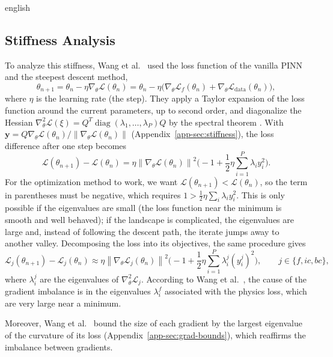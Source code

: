 \documentclass[11pt,letterpaper,twoside,openright]{book} %
\newcommand{\norm}[1]{\left\lVert #1 \right\rVert}
\newcommand{\Loss}{\mathcal{L}}
\DeclareMathOperator{\diag}{diag}
\begin{document}
\begin{hyphenrules}{english}
\subsection{Stiffness Analysis}

To analyze this stiffness, Wang et al.~\cite{wang2021gradient} used the loss function of the vanilla PINN and
the steepest descent method,
\begin{equation}
  \theta_{n+1}=\theta_n-\eta\nabla_\theta\Loss(\theta_n)=\theta_n-\eta\big(\nabla_\theta\Loss_f(\theta_n)+\nabla_\theta\Loss_{\mathrm{data}}(\theta_n)\big),
  \label{eq:gd}
\end{equation}
where $\eta$ is the learning rate (the step). They apply a Taylor expansion of the loss function around the current parameters, up to second order,
and diagonalize the Hessian $\nabla^2_\theta\Loss(\xi)=Q^{T}\diag(\lambda_1,\dots,\lambda_P)Q$ by the
spectral theorem \cite{trefethen1997}. With $\mathbf{y}=Q\nabla_\theta\Loss(\theta_n)/\norm{\nabla_\theta\Loss(\theta_n)}$
(Appendix~\ref{app-sec:stiffness}), the loss difference after one step becomes
\begin{equation}
  \Loss(\theta_{n+1})-\Loss(\theta_n)=\eta\norm{\nabla_\theta\Loss(\theta_n)}^2
  \Big(-1+\frac12\eta\sum_{i=1}^{P}\lambda_iy_i^2\Big).
  \label{eq:stiffness}
\end{equation}
For the optimization method to work, we want $\Loss(\theta_{n+1})<\Loss(\theta_n)$, so the term in
parentheses must be negative, which requires $1>\frac12\eta\sum_i\lambda_iy_i^2$. This is only possible if
the eigenvalues are small (the loss function near the minimum is smooth and well behaved); if the
landscape is complicated, the eigenvalues are large and, instead of following the descent path, the
iterate jumps away to another valley. Decomposing the loss into its objectives, the same procedure gives
\begin{equation}
  \Loss_j(\theta_{n+1})-\Loss_j(\theta_n)\approx\eta\norm{\nabla_\theta\Loss_j(\theta_n)}^2
  \Big(-1+\frac12\eta\sum_{i=1}^{P}\lambda^{j}_i(y^{j}_i)^2\Big),\qquad j\in\{f,ic,bc\},
  \label{eq:stiffness-split}
\end{equation}
where $\lambda^{j}_i$ are the eigenvalues of $\nabla^2_\theta\Loss_j$. According to
Wang et al.~\cite{wang2021gradient}, the cause of the gradient imbalance is in the eigenvalues $\lambda^{f}_i$
associated with the physics loss, which are very large near a minimum.

Moreover, Wang et al.~\cite{wang2021gradient} bound the size of each gradient by the largest eigenvalue of
the curvature of its loss (Appendix~\ref{app-sec:grad-bounds}), which reaffirms the imbalance between
gradients.


\end{hyphenrules}
\end{document}
